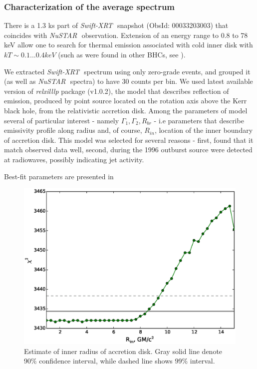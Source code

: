 \documentclass[a4paper,fleqn,usenatbib]{mnras}
\def\swiftx{{\em Swift-XRT\,}}
\def\nustar{{\em NuSTAR\,}}
\begin{document}
\subsubsection{Characterization of the average spectrum}            
There is a 1.3 ks part of \swiftx\, snapshot (ObsId: 00033203003) that coincides with \nustar\, observation. Extension of an energy range to 0.8 to 78 keV allow one to search for thermal emission associated with cold inner disk with $kT \sim 0.1...0.4 keV$ (such as were found in other BHCs, see \cite[][ e.t.c]{miller06b,miller06a,parker15}).

We extracted \swiftx\, spectrum using only zero-grade events, and grouped it (as well as \nustar\, spectra) to have 30 counts per bin. We used latest available version of {\it relxilllp} package (v1.0.2), the model that describes reflection of emission, produced by point source located on the rotation axis above the Kerr black hole, from the relativistic accretion disk. Among the parameters of model several of particular interest - namely $\Gamma_{1},\Gamma_{2},R_{br}$ - i.e parameters that describe emissivity profile along radius and, of course, $R_{in}$, location of the inner boundary of accretion disk.  This model was selected for several reasons - first, \cite{miller15_nust} found that it match observed data well, second, during the 1996 outburst source were detected at radiowaves, possibly indicating jet activity.

Best-fit parameters are presented in

\begin{figure}
\centerline{\includegraphics[width=\linewidth]{rinfit_v03.eps}}
\caption{Estimate of inner radius of accretion disk. Gray solid line denote 90\% confidence interval, while dashed line shows 99\% interval.} 
\label{fig:rin}
\end{figure}  
\end{document}
